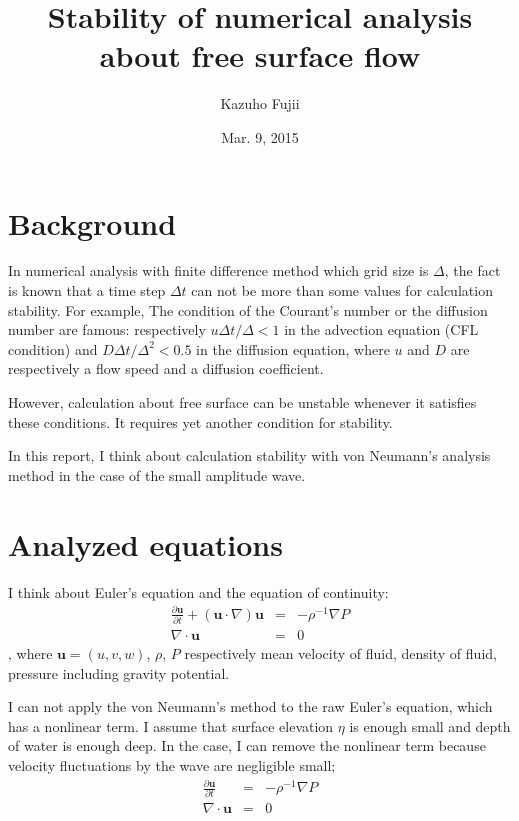 \documentclass[a4paper,11pt]{article}
\title{Stability of numerical analysis about free surface flow}
\author{Kazuho Fujii}
\date{Mar. 9, 2015}
\begin{document}
\maketitle

\section{Background}
In numerical analysis with finite difference method which grid size is $\Delta$, the fact is known that a time step $\Delta t$ can not be more than some values for calculation stability.
For example, The condition of the Courant's number or the diffusion number are famous:
respectively $u\Delta t/\Delta<1$ in the advection equation (CFL condition) and $D\Delta t/\Delta^2<0.5$ in the diffusion equation,
where $u$ and $D$ are respectively a flow speed and a diffusion coefficient.

However, calculation about free surface can be unstable whenever it satisfies these conditions. It requires yet another condition for stability. 

In this report, I think about calculation stability with von Neumann's analysis method in the case of the small amplitude wave.

\section{Analyzed equations}

I think about Euler's equation and the equation of continuity:
\begin{eqnarray}
\frac{\partial \bm{u}}{\partial t}
 + (\bm{u} \cdot \nabla)\bm{u}
&=& - \rho^{-1}\nabla P \\
\nabla \cdot \bm{u} &=& 0 
\end{eqnarray}
, where $\bm{u}=(u,v,w)$, $\rho$, $P$ respectively mean velocity of fluid, density of fluid, pressure including gravity potential.

I can not apply the von Neumann's method to the raw Euler's equation, which has a nonlinear term.
I assume that surface elevation $\eta$ is enough small and depth of water is enough deep.
In the case, I can remove the nonlinear term because velocity fluctuations by the wave are negligible small;
\begin{eqnarray}
\frac{\partial \bm{u}}{\partial t} 
&=& - \rho^{-1}\nabla P \label{linear-euler}\\
\nabla \cdot \bm{u} &=& 0 
\end{eqnarray}
\end{document}
